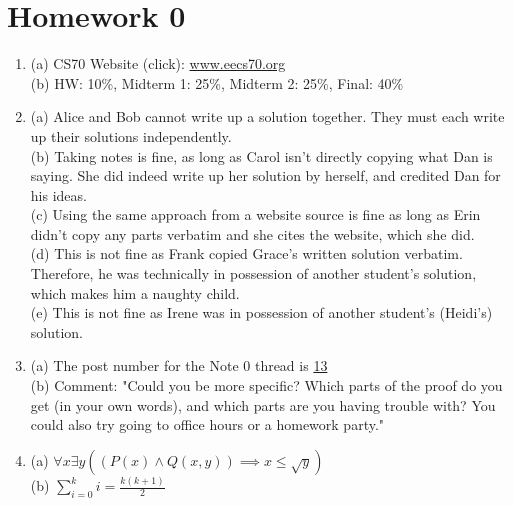 \section{Homework 0}
\begin{enumerate}
    \item (a) CS70 Website (click): \url{www.eecs70.org} \\
          (b) HW: 10\%, Midterm 1: 25\%, Midterm 2: 25\%, Final: 40\%
    \item (a)  Alice and Bob cannot write up a solution together. They must each write up their solutions independently. \\
          (b)  Taking notes is fine, as long as Carol isn't directly copying what Dan is saying. She did indeed write up her solution by herself, and credited Dan for his ideas. \\
          (c)  Using the same approach from a website source is fine as long as Erin didn't copy any parts verbatim and she cites the website, which she did. \\
          (d)  This is not fine as Frank copied Grace's written solution verbatim. Therefore, he was technically in possession of another student's solution, which makes him a naughty child. \\
          (e)  This is not fine as Irene was in possession of another student's (Heidi's) solution.
    \item (a) The post number for the Note 0 thread is \href{https://piazza.com/class/jkjku77a1h451b?cid=13}{13} \\
          (b) Comment: "Could you be more specific? Which parts of the proof do you get (in your own words), and which parts are you having trouble with? You could also try going to office hours or a homework party."
    \item (a) $\forall x \exists y((P(x)\wedge Q(x, y)) \implies x \leq \sqrt{y})$ \\
          (b) $\sum\limits_{i=0}^k i = \frac{k(k+1)}{2}$
\end{enumerate}